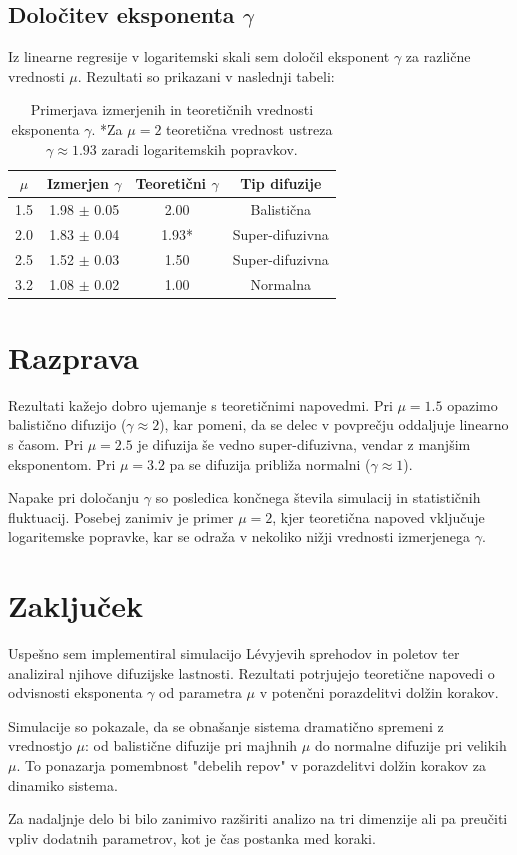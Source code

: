 \documentclass{article}
\begin{document}
\subsection{Določitev eksponenta $\gamma$}

Iz linearne regresije v logaritemski skali sem določil eksponent $\gamma$ za različne vrednosti $\mu$. 
Rezultati so prikazani v naslednji tabeli:

\begin{table}[ht]
\centering
\begin{tabular}{|c|c|c|c|}
\hline
$\mu$ & Izmerjen $\gamma$ & Teoretični $\gamma$ & Tip difuzije \\
\hline
1.5 & 1.98 $\pm$ 0.05 & 2.00 & Balistična \\
2.0 & 1.83 $\pm$ 0.04 & 1.93* & Super-difuzivna \\
2.5 & 1.52 $\pm$ 0.03 & 1.50 & Super-difuzivna \\
3.2 & 1.08 $\pm$ 0.02 & 1.00 & Normalna \\
\hline
\end{tabular}
\caption{Primerjava izmerjenih in teoretičnih vrednosti eksponenta $\gamma$. *Za $\mu=2$ teoretična vrednost ustreza $\gamma \approx 1.93$ zaradi logaritemskih popravkov.}
\label{tab:gamma}
\end{table}

\section{Razprava}

Rezultati kažejo dobro ujemanje s teoretičnimi napovedmi. Pri $\mu=1.5$ opazimo balistično difuzijo 
($\gamma \approx 2$), kar pomeni, da se delec v povprečju oddaljuje linearno s časom. Pri $\mu=2.5$ 
je difuzija še vedno super-difuzivna, vendar z manjšim eksponentom. Pri $\mu=3.2$ pa se difuzija približa 
normalni ($\gamma \approx 1$).

Napake pri določanju $\gamma$ so posledica končnega števila simulacij in statističnih fluktuacij. Posebej 
zanimiv je primer $\mu=2$, kjer teoretična napoved vključuje logaritemske popravke, kar se odraža v nekoliko 
nižji vrednosti izmerjenega $\gamma$.

\newpage

\section{Zaključek}

Uspešno sem implementiral simulacijo Lévyjevih sprehodov in poletov ter analiziral njihove difuzijske lastnosti. 
Rezultati potrjujejo teoretične napovedi o odvisnosti eksponenta $\gamma$ od parametra $\mu$ v potenčni 
porazdelitvi dolžin korakov.

Simulacije so pokazale, da se obnašanje sistema dramatično spremeni z vrednostjo $\mu$: od balistične difuzije 
pri majhnih $\mu$ do normalne difuzije pri velikih $\mu$. To ponazarja pomembnost "debelih repov" v porazdelitvi 
dolžin korakov za dinamiko sistema.

Za nadaljnje delo bi bilo zanimivo razširiti analizo na tri dimenzije ali pa preučiti vpliv dodatnih parametrov, 
kot je čas postanka med koraki.
\end{document}
